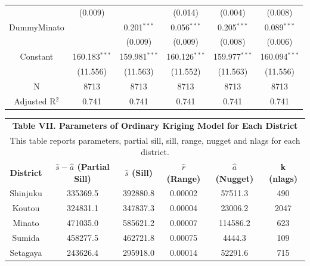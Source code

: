 \documentclass[a4paper, 12pt]{article} %
\begin{document}
\begin{longtable}[c]{cccccc}
& (0.009) & & (0.014) & (0.004) & (0.008) \\
\addlinespace[0.5em]
DummyMinato & & 0.201$^{***}$ & 0.056$^{***}$ & 0.205$^{***}$ & 0.089$^{***}$ \\
& &  (0.009) & (0.009) & (0.008) & (0.006) \\
\addlinespace[0.5em]
Constant & 160.183$^{***}$ & 159.981$^{***}$ & 160.126$^{***}$ & 159.977$^{***}$ & 160.094$^{***}$ \\
& (11.556) & (11.563) & (11.552) & (11.563) & (11.556) \\
\addlinespace[0.5em]
N & 8713 & 8713 & 8713 & 8713 & 8713 \\
Adjusted R$^{2}$ & 0.741 & 0.741 & 0.741& 0.741& 0.741 \\
\hline
\end{longtable}
\newpage

\begin{table}[!htbp] \centering 
\label{tb7}
\begin{tabular}{cccccc}
\multicolumn{6}{c}{\textbf{Table VII. Parameters of Ordinary Kriging Model for Each District}} \\
\multicolumn{6}{p{14.5cm}}{This table reports parameters, partial sill, sill, range, nugget and nlags for each district.} \\
\hline
\textbf{District} & \textbf{$\widehat{s}-\widehat{a}$ (Partial Sill)} & \textbf{$\widehat{s}$ (Sill)} & \textbf{$\widehat{r}$ (Range)} & \textbf{$\widehat{a}$ (Nugget)} & \textbf{k (nlags)} \\
\hline
Shinjuku & 335369.5 & 392880.8 & 0.00002 & 57511.3 & 490 \\
Koutou & 324831.1 & 347837.3 & 0.00004 & 23006.2 & 2047 \\
Minato & 471035.0 & 585621.2 & 0.00007 & 114586.2 & 623 \\
Sumida & 458277.5 & 462721.8 & 0.00075 & 4444.3 & 109 \\
Setagaya & 243626.4 & 295918.0 & 0.00014 & 52291.6 & 715 \\
\hline
\end{tabular}
\end{table}
\end{document}
